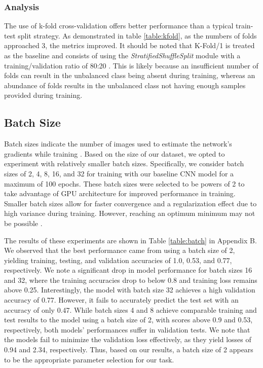 \documentclass{article}
\begin{document}
\subsubsection{Analysis}
The use of k-fold cross-validation offers better performance than a typical train-test split strategy. As demonstrated in table \ref{table:kfold}, as the numbers of folds approached 3, the metrics improved. It should be noted that K-Fold/1 is treated as the baseline and consists of using the \emph{StratifiedShuffleSplit} module with a training/validation ratio of 80:20 \cite{scikit-learn}. This is likely because an insufficient number of folds can result in the unbalanced class being absent during training, whereas an abundance of folds results in the unbalanced class not having enough samples provided during training.


\subsection{Batch Size}
Batch sizes indicate the number of images used to estimate the network’s gradients while training \cite{KANDEL2020312}. Based on the size of our dataset, we opted to experiment with relatively smaller batch sizes. Specifically, we consider batch sizes of 2, 4, 8, 16, and 32 for training with our baseline CNN model for a maximum of 100 epochs. These batch sizes were selected to be powers of 2 to take advantage of GPU architecture for improved performance in training. Smaller batch sizes allow for faster convergence and a regularization effect due to high variance during training. However, reaching an optimum minimum may not be possible \cite{KANDEL2020312}. 

The results of these experiments are shown in Table \ref{table:batch} in Appendix B. We observed that the best performance came from using a batch size of 2, yielding training, testing, and validation accuracies of 1.0, 0.53, and 0.77, respectively. We note a significant drop in model performance for batch sizes 16 and 32, where the training accuracies drop to below 0.8 and training loss remains above 0.25. Interestingly, the model with batch size 32 achieves a high validation accuracy of 0.77. However, it fails to accurately predict the test set with an accuracy of only 0.47. While batch sizes 4 and 8 achieve comparable training and test results to the model using a batch size of 2, with scores above 0.9 and 0.53, respectively, both models' performances suffer in validation tests. We note that the models fail to minimize the validation loss effectively, as they yield losses of 0.94 and 2.34, respectively. Thus, based on our results, a batch size of 2 appears to be the appropriate parameter selection for our task.
\end{document}
